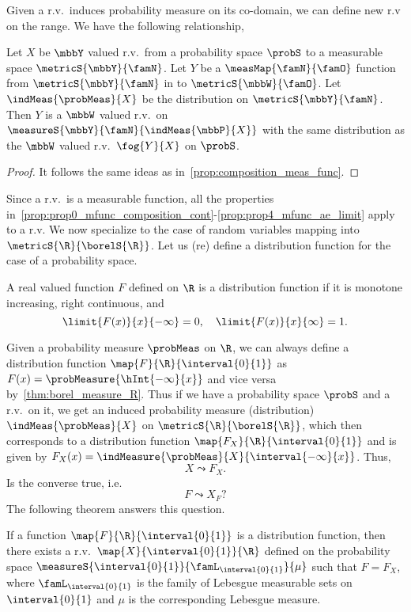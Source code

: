 Given a r.v.~induces probability measure on its co-domain, we can define new r.v on the range. We have the
following relationship,
\begin{Proposition}
    Let $X$ be $\mbbY$ valued r.v.~from a probability space $\probS$ to a 
    measurable space $\metricS{\mbbY}{\famN}$. Let $Y$ be a $\measMap{\famN}{\famO}$ 
    function from $\metricS{\mbbY}{\famN}$ in to $\metricS{\mbbW}{\famO}$. Let $\indMeas{\probMeas}{X}$ be the
    distribution on $\metricS{\mbbY}{\famN}$. Then $Y$ is a $\mbbW$ valued r.v.~on
    $\measureS{\mbbY}{\famN}{\indMeas{\mbbP}{X}}$ with the same distribution as the $\mbbW$ valued
    r.v.~$\fog{Y}{X}$ on $\probS$.
\end{Proposition}
\begin{proof}
    It follows the same ideas as in~\ref{prop:composition_meas_func}.
\end{proof}
Since a r.v.~is a measurable function, all the
properties in~\ref{prop:prop0_mfunc_composition_cont}-\ref{prop:prop4_mfunc_ae_limit} apply to a r.v.
We now specialize to the case of random variables mapping into $\metricS{\R}{\borelS{\R}}$. Let us (re) define
a distribution function for the case of a probability space.
\begin{Definition}[name=Distribution function]
    A real valued function $F$ defined on $\R$ is a distribution function if it is monotone increasing, right
    continuous, and 
    \[\limit{F(x)}{x}{-\infty} = 0,\quad \limit{F(x)}{x}{\infty} = 1.\]
\end{Definition}
Given a probability measure $\probMeas$ on $\R$, we can always define a distribution function
$\map{F}{\R}{\interval{0}{1}}$ as $F(x) = \probMeasure{\hInt{-\infty}{x}}$ and vice versa
by~\ref{thm:borel_measure_R}. Thus if we have a probability space $\probS$ and a r.v.~on it, we get an induced
probability measure (distribution) $\indMeas{\probMeas}{X}$ on $\metricS{\R}{\borelS{\R}}$,
which then corresponds to a distribution function $\map{F_X}{\R}{\interval{0}{1}}$ and is 
given by $F_X(x) = \indMeasure{\probMeas}{X}{\interval{-\infty}{x}}$.
Thus,
\[X \leadsto F_X.\]
Is the converse true, i.e.
\[F \leadsto X_F?\]
The following theorem answers this question.
\begin{Theorem}\label{thm:distribution_func_to_rv}
    If a function $\map{F}{\R}{\interval{0}{1}}$ is a distribution function, then there exists a
    r.v.~$\map{X}{\interval{0}{1}}{\R}$ defined
    on the probability space $\measureS{\interval{0}{1}}{\famL_{\interval{0}{1}}}{\mu}$ such that $F = F_X$,
    where $\famL_{\interval{0}{1}}$ is the family of Lebesgue measurable sets on $\interval{0}{1}$ and $\mu$
    is the corresponding Lebesgue measure.
\end{Theorem}
